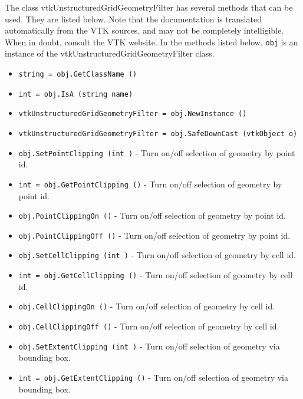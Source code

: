 The class vtkUnstructuredGridGeometryFilter has several methods that can be used.
  They are listed below.
Note that the documentation is translated automatically from the VTK sources,
and may not be completely intelligible.  When in doubt, consult the VTK website.
In the methods listed below, \verb|obj| is an instance of the vtkUnstructuredGridGeometryFilter class.
\begin{itemize}
\item  \verb|string = obj.GetClassName ()|

\item  \verb|int = obj.IsA (string name)|

\item  \verb|vtkUnstructuredGridGeometryFilter = obj.NewInstance ()|

\item  \verb|vtkUnstructuredGridGeometryFilter = obj.SafeDownCast (vtkObject o)|

\item  \verb|obj.SetPointClipping (int )| -  Turn on/off selection of geometry by point id.

\item  \verb|int = obj.GetPointClipping ()| -  Turn on/off selection of geometry by point id.

\item  \verb|obj.PointClippingOn ()| -  Turn on/off selection of geometry by point id.

\item  \verb|obj.PointClippingOff ()| -  Turn on/off selection of geometry by point id.

\item  \verb|obj.SetCellClipping (int )| -  Turn on/off selection of geometry by cell id.

\item  \verb|int = obj.GetCellClipping ()| -  Turn on/off selection of geometry by cell id.

\item  \verb|obj.CellClippingOn ()| -  Turn on/off selection of geometry by cell id.

\item  \verb|obj.CellClippingOff ()| -  Turn on/off selection of geometry by cell id.

\item  \verb|obj.SetExtentClipping (int )| -  Turn on/off selection of geometry via bounding box.

\item  \verb|int = obj.GetExtentClipping ()| -  Turn on/off selection of geometry via bounding box.


\end{itemize}
